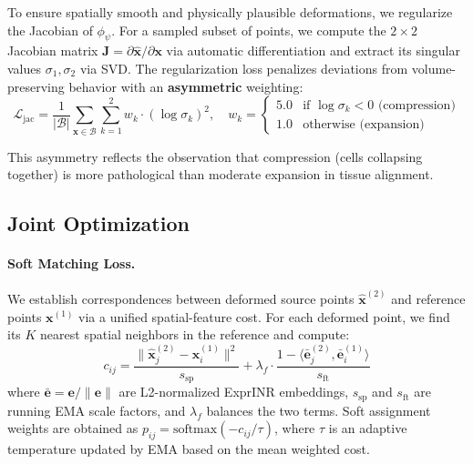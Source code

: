 \documentclass[runningheads]{llncs}
\begin{document}
To ensure spatially smooth and physically plausible deformations, we regularize the Jacobian of $\phi_\psi$. For a sampled subset of points, we compute the $2 \times 2$ Jacobian matrix $\mathbf{J} = \partial \hat{\mathbf{x}} / \partial \mathbf{x}$ via automatic differentiation and extract its singular values $\sigma_1, \sigma_2$ via SVD. The regularization loss penalizes deviations from volume-preserving behavior with an \textbf{asymmetric} weighting:
\begin{equation}
\mathcal{L}_{\text{jac}} = \frac{1}{|\mathcal{B}|} \sum_{\mathbf{x} \in \mathcal{B}} \sum_{k=1}^{2} w_k \cdot (\log \sigma_k)^2, \quad
w_k = \begin{cases} 5.0 & \text{if } \log \sigma_k < 0 \text{ (compression)} \\ 1.0 & \text{otherwise (expansion)} \end{cases}
\label{eq:jac}
\end{equation}

This asymmetry reflects the observation that compression (cells collapsing together) is more pathological than moderate expansion in tissue alignment.


\subsection{Joint Optimization}

\paragraph{Soft Matching Loss.}
We establish correspondences between deformed source points $\hat{\mathbf{x}}^{(2)}$ and reference points $\mathbf{x}^{(1)}$ via a unified spatial-feature cost. For each deformed point, we find its $K$ nearest spatial neighbors in the reference and compute:
\begin{equation}
c_{ij} = \frac{\|\hat{\mathbf{x}}_j^{(2)} - \mathbf{x}_i^{(1)}\|^2}{s_{\text{sp}}} + \lambda_f \cdot \frac{1 - \langle \bar{\mathbf{e}}_j^{(2)}, \bar{\mathbf{e}}_i^{(1)} \rangle}{s_{\text{ft}}}
\end{equation}
where $\bar{\mathbf{e}} = \mathbf{e}/\|\mathbf{e}\|$ are L2-normalized ExprINR embeddings, $s_{\text{sp}}$ and $s_{\text{ft}}$ are running EMA scale factors, and $\lambda_f$ balances the two terms. Soft assignment weights are obtained as $p_{ij} = \text{softmax}(-c_{ij} / \tau)$, where $\tau$ is an adaptive temperature updated by EMA based on the mean weighted cost.
\end{document}
